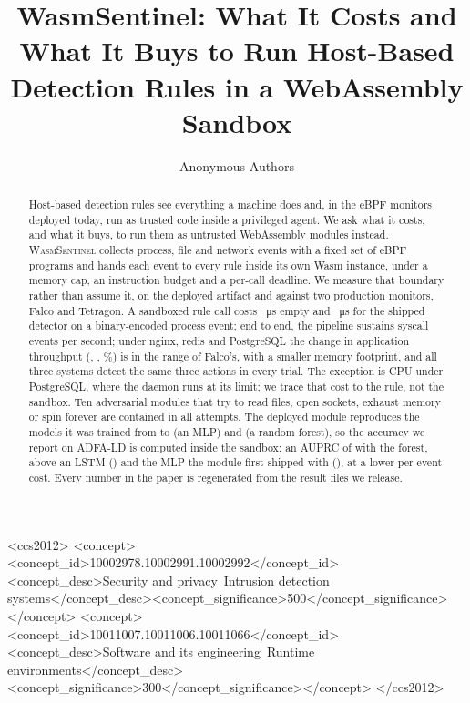 \documentclass[sigconf,anonymous,review]{acmart}
\newcommand{\sys}{\textsc{WasmSentinel}\xspace}
\begin{document}
\title{WasmSentinel: What It Costs and What It Buys to Run Host-Based Detection Rules in a WebAssembly Sandbox}

\author{Anonymous Authors}

\begin{abstract}
Host-based detection rules see everything a machine does and, in the
eBPF monitors deployed today, run as trusted code inside a privileged
agent. We ask what it costs, and what it buys, to run them as untrusted
WebAssembly modules instead. \sys collects process, file and network
events with a fixed set of eBPF programs and hands each event to every
rule inside its own Wasm instance, under a memory cap, an instruction
budget and a per-call deadline. We measure that boundary rather than
assume it, on the deployed artifact and against two production monitors,
Falco and Tetragon. A sandboxed rule call costs
\eTwoEngineOverheadUs{}~\si{\micro\second} empty and
\eTwoMlRawUs{}~\si{\micro\second} for the shipped detector on a
binary-encoded process event; end to end, the pipeline sustains
\eThreeAchievedBinFiftyKRf{} syscall events per second; under nginx, redis
and PostgreSQL the change in application throughput
(\eFourDeltaNginxWs{}, \eFourDeltaRedisWs{}, \eFourDeltaPgWs{}\%) is in
the range of Falco's, with a smaller memory footprint, and all three
systems detect the same three actions in every trial. The exception is
CPU under PostgreSQL, where the daemon runs at its limit; we trace that
cost to the rule, not the sandbox. Ten adversarial modules that try to
read files, open sockets, exhaust memory or spin forever are contained in
all \isoTotal{} attempts. The deployed module
reproduces the models it was trained from to \eTwoMaxDiffNumpyWasm{} (an
MLP) and \eOneWasmSklearnMaxDiff{} (a random forest), so the accuracy we
report on ADFA-LD is computed inside the sandbox: an AUPRC of
\eOneAuprcRfWasm{} with the forest, above an LSTM (\eOneAuprcLstm{}) and
the MLP the module first shipped with (\eOneAuprcMlp{}), at a lower
per-event cost. Every number in the paper is regenerated from the result
files we release.
\end{abstract}

\begin{CCSXML}
<ccs2012>
<concept><concept_id>10002978.10002991.10002992</concept_id><concept_desc>Security and privacy~Intrusion detection systems</concept_desc><concept_significance>500</concept_significance></concept>
<concept><concept_id>10011007.10011006.10011066</concept_id><concept_desc>Software and its engineering~Runtime environments</concept_desc><concept_significance>300</concept_significance></concept>
</ccs2012>
\end{CCSXML}
\end{document}
